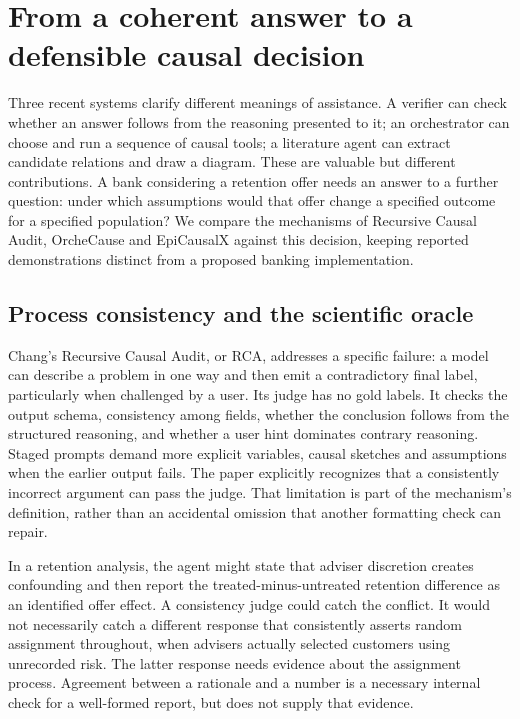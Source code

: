 \section{From a coherent answer to a defensible causal decision}
\label{exec17:frontier-start}

Three recent systems clarify different meanings of assistance. A verifier can
check whether an answer follows from the reasoning presented to it; an
orchestrator can choose and run a sequence of causal tools; a literature agent
can extract candidate relations and draw a diagram. These are valuable but
different contributions. A bank considering a retention offer needs an answer
to a further question: under which assumptions would that offer change a
specified outcome for a specified population? We compare the mechanisms of
Recursive Causal Audit, OrcheCause and EpiCausalX against this decision, keeping
reported demonstrations distinct from a proposed banking implementation.
\citep{exec17_frontier_chang,exec17_frontier_yang,exec17_frontier_liu}

\subsection{Process consistency and the scientific oracle}

Chang's Recursive Causal Audit, or RCA, addresses a specific failure: a model
can describe a problem in one way and then emit a contradictory final label,
particularly when challenged by a user. Its judge has no gold labels. It checks
the output schema, consistency among fields, whether the conclusion follows
from the structured reasoning, and whether a user hint dominates contrary
reasoning. Staged prompts demand more explicit variables, causal sketches and
assumptions when the earlier output fails. The paper explicitly recognizes
that a consistently incorrect argument can pass the judge. That limitation is
part of the mechanism's definition, rather than an accidental omission that
another formatting check can repair.\citep{exec17_frontier_chang}

In a retention analysis, the agent might state that adviser discretion creates
confounding and then report the treated-minus-untreated retention difference
as an identified offer effect. A consistency judge could catch the conflict.
It would not necessarily catch a different response that consistently asserts
random assignment throughout, when advisers actually selected customers using
unrecorded risk. The latter response needs evidence about the assignment
process. Agreement between a rationale and a number is a necessary internal
check for a well-formed report, but does not supply that evidence.

